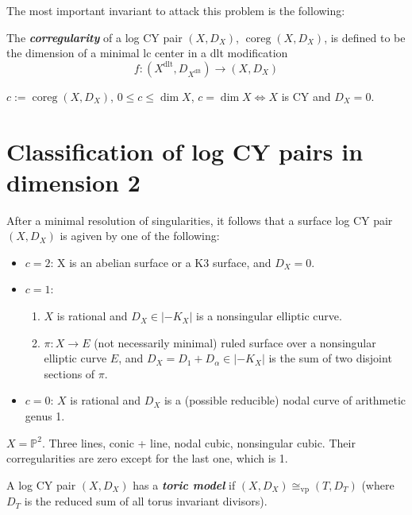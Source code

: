 The most important invariant to attack this problem is the following:

\begin{defn}
	The \textit{\textbf{corregularity}} of a log CY pair $(X,D_X)$, $\operatorname{coreg}(X,D_X)$, is defined to be the dimension of a minimal lc center in a dlt modification
	\[f:(X^{\operatorname{dlt}},D_{X^{\operatorname{dlt}}})\to (X,D_X)\]
\end{defn}

\begin{remark}
	$c:=\operatorname{coreg}(X,D_X)$, $0\leq c\leq \dim X$, $c=\dim X\iff X$ is CY and $D_X=0$.
\end{remark}

\section{Classification of log CY pairs in dimension 2}

After a minimal resolution of singularities, it follows that a surface log CY pair $(X,D_X)$ is agiven by one of the following:

\begin{itemize}
	\item $c=2$: X is an abelian surface or a K3 surface, and $D_X=0$.

	\item $c=1$:
		 \begin{enumerate}[label=(\roman*)]
			\item $X$ is rational and $D_X\in |-K_X|$ is a nonsingular elliptic curve.
			\item $\pi:X\to E$ (not necessarily minimal) ruled surface over a nonsingular elliptic curve $E$, and $D_X=D_1+D_\alpha\in |-K_{X}|$ is the sum of two disjoint sections of $ \pi$.
		\end{enumerate}
	
	\item $c=0$:  $X$ is rational and $D_X$ is a (possible reducible) nodal curve of arithmetic genus 1.
\end{itemize}

\begin{example}
	$X=\mathbb{P}^2$. Three lines, conic + line, nodal cubic, nonsingular cubic. Their corregularities are zero except for the last one, which is 1.
\end{example}

\begin{defn}
A log CY pair $(X,D_X)$ has a \textit{\textbf{toric model}} if $(X,D_X)\cong_{\operatorname{vp}}(T,D_T)$ (where $D_T$ is the reduced sum of all torus invariant divisors).
\end{defn}

